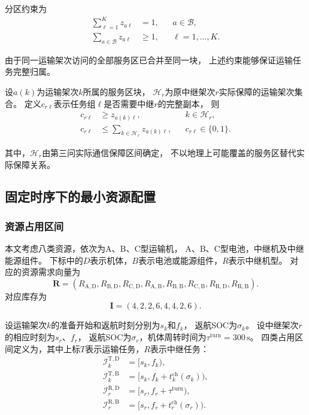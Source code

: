 \documentclass[bwprint]{gmcmthesis}
\begin{document}
分区约束为
\begin{align}
\sum_{\ell=1}^{K}z_{a\ell}&=1,
&& a\in\mathcal{B},\\
\sum_{a\in\mathcal{B}}z_{a\ell}&\geq 1,
&& \ell=1,\ldots,K.
\end{align}

由于同一运输架次访问的全部服务区已合并至同一块，
上述约束能够保证运输任务完整归属。

设$a(k)$为运输架次$k$所属的服务区块，
$\mathcal{H}_r$为原中继架次$r$实际保障的运输架次集合。
定义$c_{r\ell}$表示任务组$\ell$是否需要中继$r$的完整副本，
则
\begin{align}
c_{r\ell}&\geq z_{a(k)\ell},
&& k\in\mathcal{H}_r,\\
c_{r\ell}&\leq
\sum_{k\in\mathcal{H}_r}z_{a(k)\ell},
&& c_{r\ell}\in\{0,1\}.
\end{align}

其中，$\mathcal{H}_r$由第三问实际通信保障区间确定，
不以地理上可能覆盖的服务区替代实际保障关系。

\subsection{固定时序下的最小资源配置}

\subsubsection{资源占用区间}

本文考虑八类资源，依次为A、B、C型运输机，
A、B、C型电池，中继机及中继能源组件。
下标中的$D$表示机体，$B$表示电池或能源组件，$R$表示中继机型。
对应的资源需求向量为
\begin{equation}
\boldsymbol{R}=
\left(
R_{\mathrm{A,D}},R_{\mathrm{B,D}},R_{\mathrm{C,D}},
R_{\mathrm{A,B}},R_{\mathrm{B,B}},R_{\mathrm{C,B}},
R_{\mathrm{R,D}},R_{\mathrm{R,B}}
\right).
\end{equation}
对应库存为
\begin{equation}
\boldsymbol{I}=(4,2,2,6,4,4,2,6).
\end{equation}

设运输架次$k$的准备开始和返航时刻分别为$s_k$和$f_k$，
返航SOC为$\sigma_k$。
设中继架次$r$的相应时刻为$s_r$、$f_r$，
返航SOC为$\sigma_r$，机体周转时间为$\tau^{\mathrm{turn}}=300\,\mathrm{s}$。
四类占用区间定义为，其中上标$T$表示运输任务，$R$表示中继任务：
\begin{align}
\mathcal{I}^{\mathrm{T,D}}_k
&=[s_k,f_k),\\
\mathcal{I}^{\mathrm{T,B}}_k
&=[s_k,f_k+t^{\mathrm{ch}}_k(\sigma_k)),\\
\mathcal{I}^{\mathrm{R,D}}_r
&=[s_r,f_r+\tau^{\mathrm{turn}}),\\
\mathcal{I}^{\mathrm{R,B}}_r
&=[s_r,f_r+t^{\mathrm{ch}}_r(\sigma_r)).
\end{align}
\end{document}
